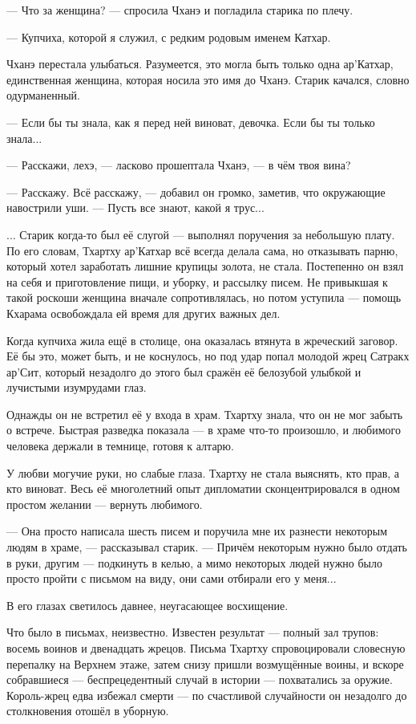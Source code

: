 --- Что за женщина? --- спросила Чханэ и погладила старика по плечу.

--- Купчиха, которой я служил, с редким родовым именем Катхар.

Чханэ перестала улыбаться.
Разумеется, это могла быть только одна ар’Катхар, единственная женщина, которая носила это имя до Чханэ.
Старик качался, словно одурманенный.

--- Если бы ты знала, как я перед ней виноват, девочка.
Если бы ты только знала...

--- Расскажи, лехэ, --- ласково прошептала Чханэ, --- в чём твоя вина?

--- Расскажу.
Всё расскажу, --- добавил он громко, заметив, что окружающие навострили уши.
--- Пусть все знают, какой я трус...

... Старик когда-то был её слугой --- выполнял поручения за небольшую плату.
По его словам, Тхартху ар’Катхар всё всегда делала сама, но отказывать парню, который хотел заработать лишние крупицы золота, не стала.
Постепенно он взял на себя и приготовление пищи, и уборку, и рассылку писем.
Не привыкшая к такой роскоши женщина вначале сопротивлялась, но потом уступила --- помощь Кхарама освобождала ей время для других важных дел.

Когда купчиха жила ещё в столице, она оказалась втянута в жреческий заговор.
Её бы это, может быть, и не коснулось, но под удар попал молодой жрец Сатракх ар’Сит, который незадолго до этого был сражён её белозубой улыбкой и лучистыми изумрудами глаз.

Однажды он не встретил её у входа в храм.
Тхартху знала, что он не мог забыть о встрече.
Быстрая разведка показала --- в храме что-то произошло, и любимого человека держали в темнице, готовя к алтарю.

У любви могучие руки, но слабые глаза.
Тхартху не стала выяснять, кто прав, а кто виноват.
Весь её многолетний опыт дипломатии сконцентрировался в одном простом желании --- вернуть любимого.

--- Она просто написала шесть писем и поручила мне их разнести некоторым людям в храме, --- рассказывал старик.
--- Причём некоторым нужно было отдать в руки, другим --- подкинуть в келью, а мимо некоторых людей нужно было просто пройти с письмом на виду, они сами отбирали его у меня...

В его глазах светилось давнее, неугасающее восхищение.

Что было в письмах, неизвестно.
Известен результат --- полный зал трупов: восемь воинов и двенадцать жрецов.
Письма Тхартху спровоцировали словесную перепалку на Верхнем этаже, затем снизу пришли возмущённые воины, и вскоре собравшиеся --- беспрецедентный случай в истории --- похватались за оружие.
Король-жрец едва избежал смерти --- по счастливой случайности он незадолго до столкновения отошёл в уборную.

